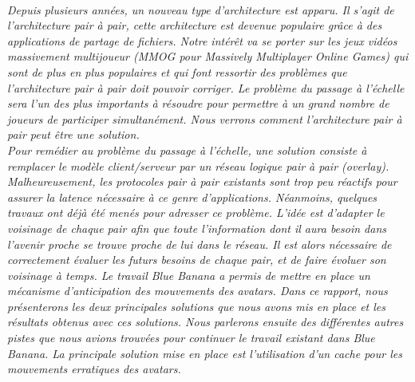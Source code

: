 \\
	\par \textit{Depuis plusieurs années, un nouveau type d'architecture est apparu. Il s'agit de l'architecture pair à pair, cette architecture est devenue populaire grâce à des applications de partage de fichiers. Notre intérêt va se porter sur les jeux vidéos massivement multijoueur (MMOG pour Massively Multiplayer Online Games) qui sont de plus en plus populaires et qui font ressortir des problèmes que l'architecture pair à pair doit pouvoir corriger. Le problème du passage à l'échelle sera l'un des plus importants à résoudre pour permettre à un grand nombre de joueurs de participer simultanément. Nous verrons comment l'architecture pair à pair peut être une solution.\\ 
	 Pour remédier au problème du passage à l'échelle, une solution consiste à remplacer le modèle client/serveur par un réseau logique pair à pair (overlay). Malheureusement, les protocoles pair à pair existants sont trop peu réactifs pour assurer la latence nécessaire à ce genre d’applications. Néanmoins, quelques travaux ont déjà été menés pour adresser ce problème. L’idée est d’adapter le voisinage de chaque pair afin que toute l’information dont il aura besoin dans l'avenir proche se trouve proche de lui dans le réseau. Il est alors nécessaire de correctement évaluer les futurs besoins de chaque pair, et de faire évoluer son voisinage à temps. Le travail Blue Banana a permis de mettre en place un mécanisme d'anticipation des mouvements des avatars. Dans ce rapport, nous présenterons les deux principales solutions que nous avons mis en place et les résultats obtenus avec ces solutions. Nous parlerons ensuite des différentes autres pistes que nous avions trouvées pour continuer le travail existant dans Blue Banana. La principale solution mise en place est l'utilisation d'un cache pour les mouvements erratiques des avatars.}\\
